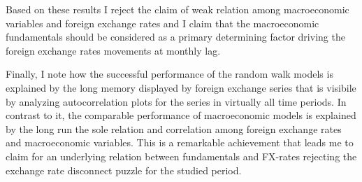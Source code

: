 Based on these results I reject the claim of weak relation among
macroeconomic variables and foreign exchange rates and I claim that
the macroeconomic fundamentals should be considered as a primary
determining factor driving the foreign exchange rates movements at
monthly lag.

Finally, I note how the successful performance of the random walk
models is explained by the long memory displayed by foreign exchange
series that is visibile by analyzing autocorrelation plots for the
series in virtually all time periods.  In contrast to it, the
comparable performance of macroeconomic models is explained by the
long run the sole relation and correlation among foreign exchange
rates and macroeconomic variables. This is a remarkable achievement
that leads me to claim for an underlying relation between fundamentals
and FX-rates rejecting the exchange rate disconnect puzzle for the
studied period.
